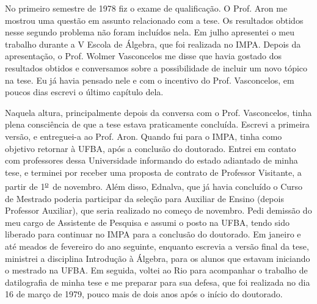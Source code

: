 \documentclass{hipatia}
\newcommand{\superou}{\textsuperscript{\underline{o}}~}
\begin{document}
No primeiro semestre de 1978 fiz o exame de qualificação. O
Prof. Aron me mostrou uma questão em assunto relacionado com
a tese. Os resultados obtidos nesse segundo problema não
foram incluídos nela. Em julho apresentei o meu trabalho
durante a V Escola de Álgebra, que foi realizada no IMPA.
Depois da apresentação, o Prof. Wolmer Vasconcelos me disse
que havia gostado dos resultados obtidos e conversamos sobre
a possibilidade de incluir um novo tópico na tese. Eu já
havia pensado nele e com o incentivo do Prof. Vasconcelos,
em poucos dias escrevi o último capítulo dela.

Naquela altura, principalmente depois da conversa com o
Prof. Vasconcelos, tinha plena consciência de que a tese
estava praticamente concluída. Escrevi a primeira versão, e
entreguei-a ao Prof. Aron. Quando fui para o IMPA, tinha
como objetivo retornar à UFBA, após a conclusão do doutorado. 
Entrei em contato com professores dessa Universidade
informando do estado adiantado de minha tese, e terminei por
receber uma proposta de contrato de Professor Visitante, a
partir de 1\superou  de novembro. Além disso, Ednalva, que já havia
concluído o Curso de Mestrado poderia participar da seleção
para Auxiliar de Ensino (depois Professor Auxiliar), que
seria realizado no começo de novembro. Pedi demissão do meu
cargo de Assistente de Pesquisa e assumi o posto na UFBA,
tendo sido liberado para continuar no IMPA para a conclusão
do doutorado. Em janeiro e até meados de fevereiro do ano
seguinte, enquanto escrevia a versão final da tese,
ministrei a disciplina Introdução à Álgebra, para os alunos
que estavam iniciando o mestrado na UFBA. Em seguida, voltei
ao Rio para acompanhar o trabalho de datilografia de minha
tese e me preparar para sua defesa, que foi realizada no dia
16 de março de 1979, pouco mais de dois anos após o início
do doutorado.
\end{document}
